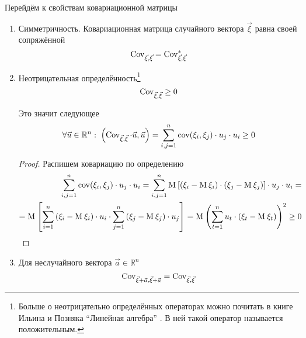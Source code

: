 Перейдём к свойствам ковариационной матрицы
\begin{enumerate}
  \item
    Симметричность. Ковариационная матрица случайного вектора $\vec{\xi}$
    равна своей сопряжённой
    $$\operatorname{Cov}^{}_{\vec{\xi}, \vec{\xi}} = \operatorname{Cov}^{*}_{\vec{\xi}, \vec{\xi}}$$
  \item\label{item:property:cov:NonNegativeDefinition}
    Неотрицательная определённость\footnote{Больше о неотрицательно
    определённых операторах можно почитать в книге Ильина и Позняка
    ``Линейная алгебра'' \cite[с.~139]{IlinPoznyarLA}.
    В ней такой оператор называется положительным.}
    $$\operatorname{Cov}^{}_{\vec{\xi}, \vec{\xi}} \ge 0$$

    Это значит следующее
    $$\forall \vec{u} \in \mathbb{R}^n:\;
    \left( \operatorname{Cov}^{}_{\vec{\xi}, \vec{\xi}} \cdot \vec{u}, \vec{u} \right)
    = \sum_{i,j=1}^{n} \operatorname{cov}\!\left( \xi_i, \xi_j \right) \cdot u_j \cdot u_i
    \ge 0$$

    \begin{proof}
    Распишем ковариацию по определению
    \begin{align*}
        \sum_{i,j=1}^{n} \operatorname{cov}\!\left( \xi_i, \xi_j \right) \cdot u_j \cdot u_i
        = \sum_{i,j=1}^{n} \operatorname{M}_{} \left[ \left( \xi_i - \operatorname{M}_{} \xi_i \right)
          \cdot \left( \xi_j - \operatorname{M}_{} \xi_j \right) \right]
          \cdot u_j \cdot u_i = \\
        = \operatorname{M}_{} \left[ \sum_{i=1}^{n} \left( \xi_i - \operatorname{M}_{} \xi_i \right) \cdot u_i
          \cdot \sum_{j=1}^{n}\left( \xi_j - \operatorname{M}_{} \xi_j \right) \cdot u_j \right]
        = \operatorname{M}_{} \left( \sum_{t=1}^{n} u_t
          \cdot \left( \xi_t - \operatorname{M}_{} \xi_t \right) \right)^2
        \ge 0
    \end{align*}
    \end{proof}
  \item
    Для неслучайного вектора $\vec{a} \in \mathbb{R}^n$
    \begin{equation*}
      \operatorname{Cov}^{}_{\vec{\xi} + \vec{a}, \vec{\xi} + \vec{a}} = \operatorname{Cov}^{}_{\vec{\xi}, \vec{\xi}}
    \end{equation*}
\end{enumerate}

